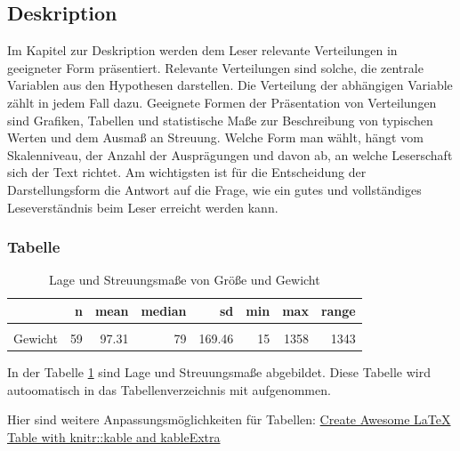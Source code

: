 \documentclass[
  12pt,
]{article}
\begin{document}
\hypertarget{deskription}{%
\subsection{Deskription}\label{deskription}}

Im Kapitel zur Deskription werden dem Leser relevante Verteilungen in
geeigneter Form präsentiert. Relevante Verteilungen sind solche, die
zentrale Variablen aus den Hypothesen darstellen. Die Verteilung der
abhängigen Variable zählt in jedem Fall dazu. Geeignete Formen der
Präsentation von Verteilungen sind Grafiken, Tabellen und statistische
Maße zur Beschreibung von typischen Werten und dem Ausmaß an Streuung.
Welche Form man wählt, hängt vom Skalenniveau, der Anzahl der
Ausprägungen und davon ab, an welche Leserschaft sich der Text richtet.
Am wichtigsten ist für die Entscheidung der Darstellungsform die Antwort
auf die Frage, wie ein gutes und vollständiges Leseverständnis beim
Leser erreicht werden kann.

\hypertarget{tabelle}{%
\subsubsection{Tabelle}\label{tabelle}}

\begin{table}

\caption{\label{tab:unnamed-chunk-7}\label{tab:tab1}Lage und Streuungsmaße von Größe und Gewicht }
\centering
\begin{tabular}[t]{lrrrrrrr}
\toprule
  & n & mean & median & sd & min & max & range\\
\midrule
\cellcolor{gray!6}{Größe} & \cellcolor{gray!6}{59} & \cellcolor{gray!6}{174.02} & \cellcolor{gray!6}{180} & \cellcolor{gray!6}{35.53} & \cellcolor{gray!6}{66} & \cellcolor{gray!6}{234} & \cellcolor{gray!6}{168}\\
Gewicht & 59 & 97.31 & 79 & 169.46 & 15 & 1358 & 1343\\
\bottomrule
\end{tabular}
\end{table}

In der Tabelle \ref{tab:tab1} sind Lage und Streuungsmaße abgebildet.
Diese Tabelle wird autoomatisch in das Tabellenverzeichnis mit
aufgenommen.

Hier sind weitere Anpassungsmöglichkeiten für Tabellen:
\href{https://haozhu233.github.io/kableExtra/awesome_table_in_pdf.pdf}{Create
Awesome LaTeX Table with knitr::kable and kableExtra}
\end{document}

